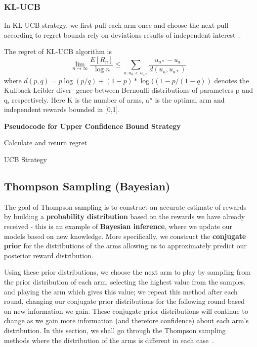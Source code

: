 \subsubsection{KL-UCB}
In KL-UCB strategy, we first pull each arm once and choose the next pull according to regret bounds rely on deviations results of independent interest~\citep{Garivier2011}.
\par
The regret of KL-UCB algorithm is \[\lim_{n\to \infty} \frac{E[R_n]}{\log n} \leq  \sum_{a:u_a < u_{a*}} \frac{u_{a*}-u_a}{d(u_a,u_{a*})}  \]
where $d(p, q) = p \log(p/q) + (1 - p) * \log((1 - p/(1 - q))$ denotes the Kullback-Leibler diver- gence between Bernoulli distributions of parameters p and q, respectively.
Here K is the number of arms, a* is the optimal arm and independent rewards bounded in [0,1].\citep{Garivier2011}
\par
\textbf{Pseudocode for Upper Confidence Bound Strategy}
\newline
\begin{algorithm}[H]
        Calculate and return regret
        \caption{UCB Strategy}\label{alg:ucb_algorithm}
    \end{algorithm}

\subsection{Thompson Sampling (Bayesian)}\label{subsec:thompson-sampling-(bayesian)}
The goal of Thompson sampling is to construct an accurate estimate of rewards by building a \textbf{probability distribution} based on the rewards we have already received - this is an example of \textbf{Bayesian inference}, where we update our models based on new knowledge.
More specifically, we construct the \textbf{conjugate prior} for the distributions of the arms allowing us to approximately predict our posterior reward distribution.
\par
Using these prior distributions, we choose the next arm to play by sampling from the prior distribution of each arm, selecting the highest value from the samples, and playing the arm which gives this value;
we repeat this method after each round, changing our conjugate prior distributions for the following round based on new information we gain.
These conjugate prior distributions will continue to change as we gain more information (and therefore confidence) about each arm's distribution.
In this section, we shall go through the Thompson sampling methods where the distribution of the arms is different in each case~\citep{agrawal2012analysis}.

